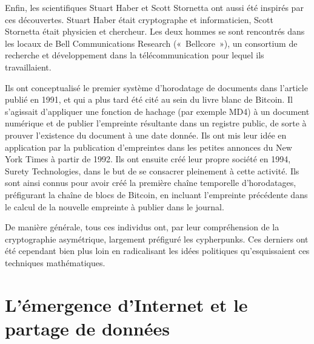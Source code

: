 Enfin, les scientifiques Stuart Haber et Scott Stornetta ont aussi été inspirés par ces découvertes. Stuart Haber était cryptographe et informaticien, Scott Stornetta était physicien et chercheur. Les deux hommes se sont rencontrés dans les locaux de Bell Communications Research («~Bellcore~»), un consortium de recherche et développement dans la télécommunication pour lequel ils travaillaient.

Ils ont conceptualisé le premier système d'horodatage de documents dans l'article  publié en 1991, et qui a plus tard été cité au sein du livre blanc de Bitcoin. Il s'agissait d'appliquer une fonction de hachage (par exemple MD4) à un document numérique et de publier l'empreinte résultante dans un registre public, de sorte à prouver l'existence du document à une date donnée. Ils ont mis leur idée en application par la publication d'empreintes dans les petites annonces du New York Times à partir de 1992. Ils ont ensuite créé leur propre société en 1994, Surety Technologies, dans le but de se consacrer pleinement à cette activité. Ils sont ainsi connus pour avoir créé la première chaîne temporelle d'horodatages, préfigurant la chaîne de blocs de Bitcoin, en incluant l'empreinte précédente dans le calcul de la nouvelle empreinte à publier dans le journal.

De manière générale, tous ces individus ont, par leur compréhension de la cryptographie asymétrique, largement préfiguré les cypherpunks. Ces derniers ont été cependant bien plus loin en radicalisant les idées politiques qu'esquissaient ces techniques mathématiques.

\vspace{-1em}
\section*{L'émergence d'Internet et le partage de données} %


